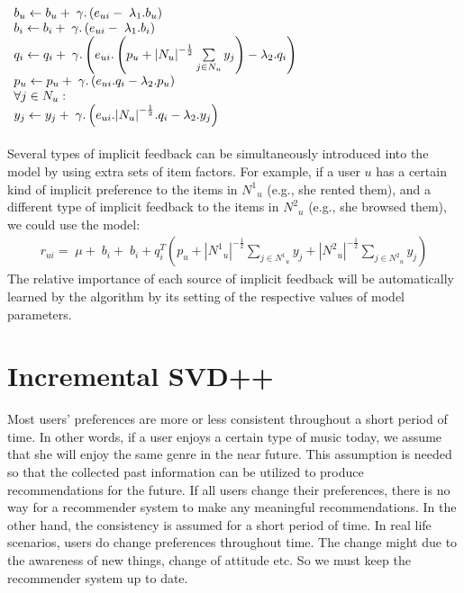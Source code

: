 \documentclass[oneside,13pt]{extreport}
\begin{document}
$
\begin{array}{l}{b_u} \leftarrow {b_u} + {\rm{\;}}{\gamma}.\left( {{e_{ui}} - {\rm{\;}}{\lambda _1}.{b_u}} \right)\\{b_i} \leftarrow {b_i} + {\rm{\;}}{\gamma}.\left( {{e_{ui}} - {\rm{\;}}{\lambda _1}.{b_i}} \right)\\{q_i} \leftarrow {q_i} + {\rm{\;}}{\gamma}.\left( {{e_{ui}}.\left( {{p_u} + {{\left| {{N_u}} \right|}^{ - \frac{1}{2}}}\sum\limits_{j \in {N_u}} {{y_j}} } \right) - {\lambda _2}.{q_i}} \right)\\{p_u} \leftarrow {p_u} + {\rm{\;}}{\gamma}.\left( {{e_{ui}}.{q_i} - {\lambda _2}.{p_u}} \right)\\\forall j \in {N_u}:\\{y_j} \leftarrow {y_j} + {\rm{\;}}{\gamma}.\left( {{e_{ui}}.{{\left| {{N_u}} \right|}^{ - \frac{1}{2}}}.{q_i} - {\lambda _2}.{y_j}} \right)\end{array}
$
\\
\\
Several types of implicit feedback can be simultaneously introduced into the
model by using extra sets of item factors. For example, if a user $u$ has a certain
kind of implicit preference to the items in ${N^1}_u$ (e.g., she rented them), and a different
type of implicit feedback to the items in ${N^2}_u$ (e.g., she browsed them), we
could use the model: 
\begin{eqnarray}
\label{eq:svd++_pre2}
{r_{ui}} = \;\mu  + \;{b_i} + \;{b_i} + q_i^T\left( {{p_u} + {{\left| {{N^1}_u} \right|}^{ - \frac{1}{2}}}\sum\limits_{j  \in {N^1}_u} {{y_j}}  + {{\left| {{N^2}_u} \right|}^{ - \frac{1}{2}}}\sum\limits_{j \in   {N^2}_u} {{y_j}} } \right)
\end{eqnarray}
The relative importance of each source of implicit feedback will be automatically
learned by the algorithm by its setting of the respective values of model parameters.
\section{Incremental SVD++}
Most users’ preferences are more or less consistent throughout a short period of time. In other words, if a user enjoys a certain type of music today, we assume that she will enjoy the same genre in the near future. This assumption is needed so that the collected past information can be utilized to produce recommendations for the future. If all users change their preferences, there is no way for a recommender
system to make any meaningful recommendations. In the other hand, the consistency is assumed for a short period of time. In real life scenarios, users do change preferences throughout time. The change might due to the awareness of new things, change of attitude etc. So we must keep the recommender system up to date.
\end{document}
